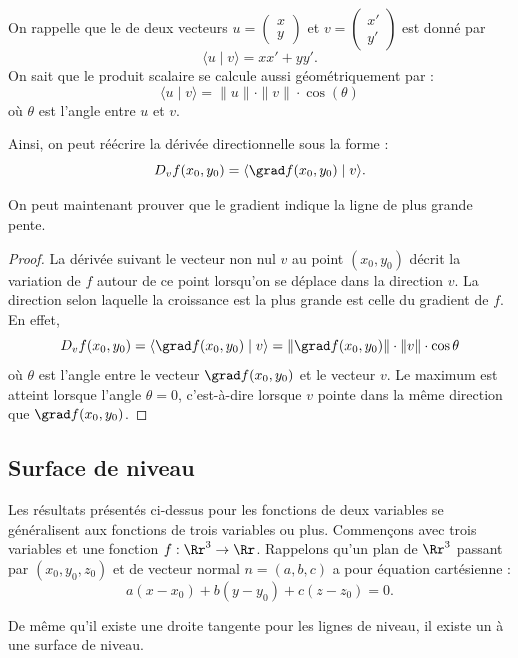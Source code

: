 On rappelle que le  de deux vecteurs $u=\left(\begin{smallmatrix}x\\y\end{smallmatrix}\right)$ et 
$v=\left(\begin{smallmatrix}x'\\y'\end{smallmatrix}\right)$
est donné par 
$$\langle u \mid v \rangle = xx' + yy'.$$
On sait que le produit scalaire se calcule aussi géométriquement par :
$$\langle u \mid v \rangle = \|u\|\cdot \|v\| \cdot \cos(\theta)$$
où $\theta$ est l'angle entre $u$ et $v$.



Ainsi, on peut réécrire la dérivée directionnelle sous la forme :
$$D_v f(x_0,y_0) = \langle \grad f (x_0,y_0) \mid v \rangle.$$


On peut maintenant prouver que le gradient indique la ligne de plus grande pente.

\begin{proof}
	La dérivée suivant le vecteur non nul $v$ au point $(x_0,y_0)$ décrit la variation de $f$ autour de ce point lorsqu'on se déplace dans la direction $v$. 
	La direction selon laquelle la croissance est la plus grande est celle du gradient de $f$. En effet,
	$$D_{v}f(x_0,y_0)=\langle \grad f(x_0,y_0) \mid v\rangle=
	\| \grad f(x_0,y_0) \| \cdot \| v \| \cdot \cos \theta$$
	où $\theta$ est l'angle entre le vecteur $\grad f(x_0,y_0)$ et le vecteur $v$.
	Le maximum est atteint lorsque l'angle $\theta=0$, c'est-à-dire lorsque $v$ pointe dans la même direction que $\grad f(x_0,y_0)$.
\end{proof}


\subsection{Surface de niveau}

Les résultats présentés ci-dessus pour les fonctions de deux variables se généralisent aux fonctions de trois variables ou plus.
Commençons avec trois variables et une fonction $f:\Rr^3 \to \Rr$.
Rappelons qu'un plan de $\Rr^3$ passant par $(x_0,y_0,z_0)$ et de vecteur normal 
$n=(a,b,c)$ a pour équation cartésienne :
$$a(x-x_0)+b(y-y_0)+c(z-z_0) = 0.$$


De même qu'il existe une droite tangente pour les lignes de niveau, il existe un  à une surface de niveau.


